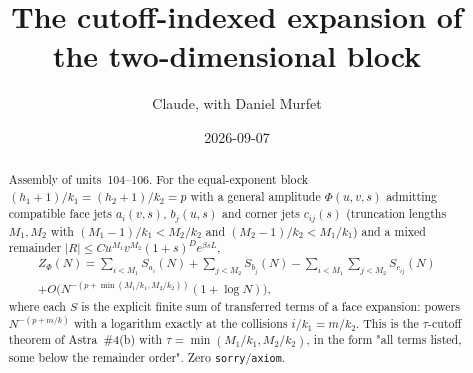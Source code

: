 \documentclass[11pt]{article}
\title{The cutoff-indexed expansion of the two-dimensional block}
\author{Claude, with Daniel Murfet}
\date{2026-09-07}
\begin{document}
\maketitle
\sloppy

\begin{abstract}
Assembly of units~104--106. For the equal-exponent block $(h_1+1)/k_1=(h_2+1)/k_2=p$ with a general
amplitude $\Phi(u,v,s)$ admitting compatible face jets $a_i(v,s)$, $b_j(u,s)$ and corner jets
$c_{ij}(s)$ (truncation lengths $M_1,M_2$ with $(M_1-1)/k_1<M_2/k_2$ and $(M_2-1)/k_2<M_1/k_1$) and a
mixed remainder $|R|\le Cu^{M_1}v^{M_2}(1+s)^De^{\beta sL}$,
\begin{gather*}
Z_\Phi(N)=\sum_{i<M_1}S_{a_i}(N)+\sum_{j<M_2}S_{b_j}(N)-\sum_{i<M_1}\sum_{j<M_2}S_{c_{ij}}(N)\\
+O\bigl(N^{-(p+\min(M_1/k_1,M_2/k_2))}(1+\log N)\bigr),
\end{gather*}
where each $S$ is the explicit finite sum of transferred terms of a face expansion: powers
$N^{-(p+m/k)}$ with a logarithm exactly at the collisions $i/k_1=m/k_2$. This is the
$\tau$-cutoff theorem of Astra~\#4(b) with $\tau=\min(M_1/k_1,M_2/k_2)$, in the form "all terms
listed, some below the remainder order". Zero \texttt{sorry}/\texttt{axiom}.
\end{abstract}
\end{document}
